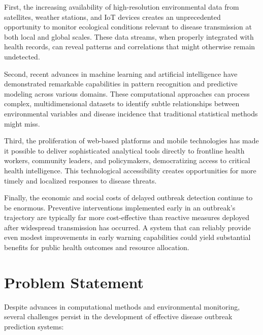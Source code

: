 \documentclass[12pt,a4paper]{report}
\begin{document}
First, the increasing availability of high-resolution environmental data from satellites, weather stations, and IoT devices creates an unprecedented opportunity to monitor ecological conditions relevant to disease transmission at both local and global scales. These data streams, when properly integrated with health records, can reveal patterns and correlations that might otherwise remain undetected.

Second, recent advances in machine learning and artificial intelligence have demonstrated remarkable capabilities in pattern recognition and predictive modeling across various domains. These computational approaches can process complex, multidimensional datasets to identify subtle relationships between environmental variables and disease incidence that traditional statistical methods might miss.

Third, the proliferation of web-based platforms and mobile technologies has made it possible to deliver sophisticated analytical tools directly to frontline health workers, community leaders, and policymakers, democratizing access to critical health intelligence. This technological accessibility creates opportunities for more timely and localized responses to disease threats.

Finally, the economic and social costs of delayed outbreak detection continue to be enormous. Preventive interventions implemented early in an outbreak's trajectory are typically far more cost-effective than reactive measures deployed after widespread transmission has occurred. A system that can reliably provide even modest improvements in early warning capabilities could yield substantial benefits for public health outcomes and resource allocation.

\section{Problem Statement}
Despite advances in computational methods and environmental monitoring, several challenges persist in the development of effective disease outbreak prediction systems:
\end{document}
